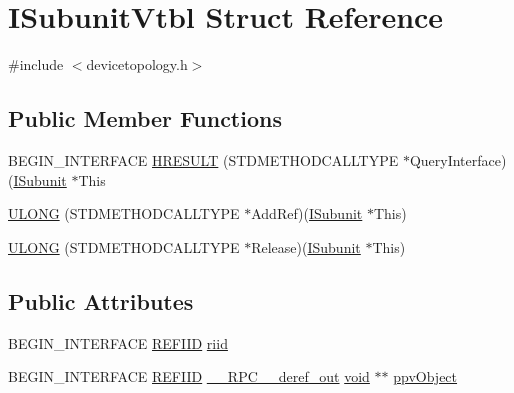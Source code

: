 \hypertarget{struct_i_subunit_vtbl}{}\section{I\+Subunit\+Vtbl Struct Reference}
\label{struct_i_subunit_vtbl}


{\ttfamily \#include $<$devicetopology.\+h$>$}

\subsection*{Public Member Functions}
\begin{DoxyCompactItemize}
\item 
B\+E\+G\+I\+N\+\_\+\+I\+N\+T\+E\+R\+F\+A\+CE \hyperlink{struct_i_subunit_vtbl_ab0c5f5b8699a08e2c5edfc6be1fe1f47}{H\+R\+E\+S\+U\+LT} (S\+T\+D\+M\+E\+T\+H\+O\+D\+C\+A\+L\+L\+T\+Y\+PE $\ast$Query\+Interface)(\hyperlink{devicetopology_8h_a699f46e395daf19f978800c852f09860}{I\+Subunit} $\ast$This
\item 
\hyperlink{struct_i_subunit_vtbl_a35fb4840cb2874394eb1c4f356242556}{U\+L\+O\+NG} (S\+T\+D\+M\+E\+T\+H\+O\+D\+C\+A\+L\+L\+T\+Y\+PE $\ast$Add\+Ref)(\hyperlink{devicetopology_8h_a699f46e395daf19f978800c852f09860}{I\+Subunit} $\ast$This)
\item 
\hyperlink{struct_i_subunit_vtbl_aacc3485c92f9bcb605fa2cfe30308ea8}{U\+L\+O\+NG} (S\+T\+D\+M\+E\+T\+H\+O\+D\+C\+A\+L\+L\+T\+Y\+PE $\ast$Release)(\hyperlink{devicetopology_8h_a699f46e395daf19f978800c852f09860}{I\+Subunit} $\ast$This)
\end{DoxyCompactItemize}
\subsection*{Public Attributes}
\begin{DoxyCompactItemize}
\item 
B\+E\+G\+I\+N\+\_\+\+I\+N\+T\+E\+R\+F\+A\+CE \hyperlink{px__win__ds_8c_a80ec49c8ae61e234197d5071d2df497d}{R\+E\+F\+I\+ID} \hyperlink{struct_i_subunit_vtbl_a5d75c205077e6a4a234e15f34d738910}{riid}
\item 
B\+E\+G\+I\+N\+\_\+\+I\+N\+T\+E\+R\+F\+A\+CE \hyperlink{px__win__ds_8c_a80ec49c8ae61e234197d5071d2df497d}{R\+E\+F\+I\+ID} \hyperlink{rpcsal_8h_a23bc188526f10656f9c79d950f6c3192}{\+\_\+\+\_\+\+R\+P\+C\+\_\+\+\_\+deref\+\_\+out} \hyperlink{sound_8c_ae35f5844602719cf66324f4de2a658b3}{void} $\ast$$\ast$ \hyperlink{struct_i_subunit_vtbl_ad03f289b325a80bb375d8f188f7de739}{ppv\+Object}
\end{DoxyCompactItemize}


